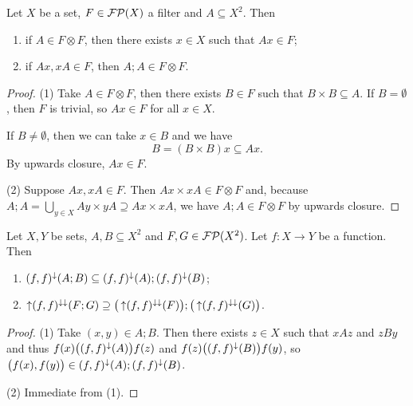 \begin{lemma} \label{principalImageOfInProductFilter}
Let $X$ be a set, $F\in \operatorname{\mathcal{FP}}(X)$ a filter and $A\subseteq X^2$. Then
\begin{enumerate}
\item if $A\in F\otimes F$, then there exists $x\in X$ such that $Ax\in F$;
\item if $Ax, xA\in F$, then $A;A \in F\otimes F$.
\end{enumerate}
\end{lemma}
\begin{proof}
(1) Take $A\in F\otimes F$, then there exists $B\in F$ such that $B\times B\subseteq A$. If $B = \emptyset$, then $F$ is trivial, so $Ax\in F$ for all $x\in X$.

If $B \neq \emptyset$, then we can take $x\in B$ and we have
\[ B = (B\times B)x \subseteq Ax. \]
By upwards closure, $Ax\in F$.

(2) Suppose $Ax, xA\in F$. Then $Ax\times xA \in F\otimes F$ and, because $A;A = \bigcup_{y\in X}Ay\times yA \supseteq Ax\times xA$, we have $A;A\in F\otimes F$ by upwards closure.
\end{proof}

\begin{proposition} \label{imageFilterComposition}
Let $X, Y$ be sets, $A,B\subseteq X^2$ and $F,G\in\operatorname{\mathcal{FP}}(X^2)$. Let $f: X\to Y$ be a function. Then
\begin{enumerate}
\item $(f,f)^{\downarrow}(A;B) \subseteq (f,f)^{\downarrow}(A);(f,f)^\downarrow(B)$;
\item $\operatorname{\uparrow}(f,f)^{\downarrow\downarrow}(F;G) \supseteq \big(\operatorname{\uparrow}(f,f)^{\downarrow\downarrow}(F)\big);\big(\operatorname{\uparrow}(f,f)^{\downarrow\downarrow}(G)\big)$.
\end{enumerate}
\end{proposition}
\begin{proof}
(1) Take $(x,y)\in A;B$. Then there exists $z\in X$ such that $xAz$ and $zBy$ and thus $f(x)\big((f,f)^{\downarrow}(A)\big)f(z)$ and $f(z)\big((f,f)^{\downarrow}(B)\big)f(y)$, so $\big(f(x), f(y)\big)\in (f,f)^{\downarrow}(A);(f,f)^\downarrow(B)$.

(2) Immediate from (1).
\end{proof}

